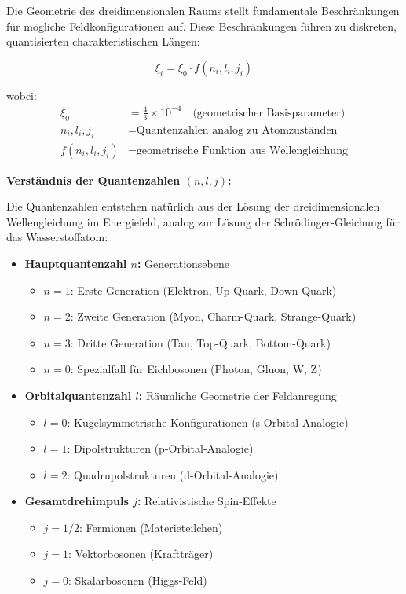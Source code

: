 \documentclass[12pt,a4paper]{article}
\begin{document}
	Die Geometrie des dreidimensionalen Raums stellt fundamentale Beschränkungen für mögliche Feldkonfigurationen auf. Diese Beschränkungen führen zu diskreten, quantisierten charakteristischen Längen:
	
	\begin{equation}
		\xi_i = \xi_0 \cdot f(n_i, l_i, j_i)
		\label{eq:geometric_quantization}
	\end{equation}
	
	wobei:
	\begin{align}
		\xi_0 &= \frac{4}{3} \times 10^{-4} \quad \text{(geometrischer Basisparameter)} \\
		n_i, l_i, j_i &= \text{Quantenzahlen analog zu Atomzuständen} \\
		f(n_i, l_i, j_i) &= \text{geometrische Funktion aus Wellengleichung}
	\end{align}
	
	\textbf{Verständnis der Quantenzahlen $(n,l,j)$:}
	
	Die Quantenzahlen entstehen natürlich aus der Lösung der dreidimensionalen Wellengleichung im Energiefeld, analog zur Lösung der Schrödinger-Gleichung für das Wasserstoffatom:
	
	\begin{itemize}
		\item \textbf{Hauptquantenzahl $n$:} Generationsebene
		\begin{itemize}
			\item $n=1$: Erste Generation (Elektron, Up-Quark, Down-Quark)
			\item $n=2$: Zweite Generation (Myon, Charm-Quark, Strange-Quark)
			\item $n=3$: Dritte Generation (Tau, Top-Quark, Bottom-Quark)
			\item $n=0$: Spezialfall für Eichbosonen (Photon, Gluon, W, Z)
		\end{itemize}
		
		\item \textbf{Orbitalquantenzahl $l$:} Räumliche Geometrie der Feldanregung
		\begin{itemize}
			\item $l=0$: Kugelsymmetrische Konfigurationen (s-Orbital-Analogie)
			\item $l=1$: Dipolstrukturen (p-Orbital-Analogie)
			\item $l=2$: Quadrupolstrukturen (d-Orbital-Analogie)
		\end{itemize}
		
		\item \textbf{Gesamtdrehimpuls $j$:} Relativistische Spin-Effekte
		\begin{itemize}
			\item $j=1/2$: Fermionen (Materieteilchen)
			\item $j=1$: Vektorbosonen (Kraftträger)
			\item $j=0$: Skalarbosonen (Higgs-Feld)
		\end{itemize}
	\end{itemize}
	
\end{document}
